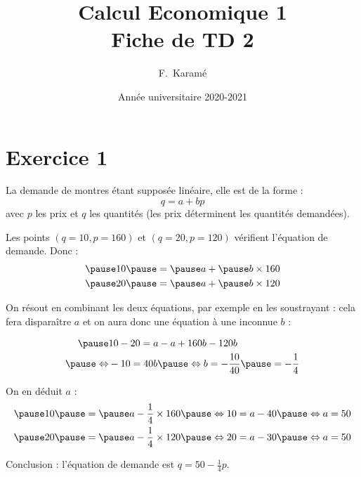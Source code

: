\documentclass[9pt,professionalfonts,handout,hyperref]{beamer}
\title{Calcul Economique 1\\Fiche de TD 2}
\author{F.~Karamé}
\date{Année universitaire 2020-2021}
\begin{document}
\begin{frame}
	\titlepage
\end{frame}

\section{Exercice 1}

%
%

\begin{frame}

La demande de montres étant supposée linéaire, elle est de la forme : $$q = a + bp $$ avec $p$ les prix et $q$ les quantités (les prix déterminent les quantités demandées).\newline

\pause Les points $(q=10,p=160)$ et $(q=20,p=120)$ vérifient l'équation de demande. \pause Donc : 
\[
\begin{aligned}
\pause 10 \pause &= \pause a + \pause b\times 160  \\
\pause 20 \pause &= \pause a + \pause b\times 120 
\end{aligned}
\]

\pause On résout en combinant les deux équations, par exemple en les soustrayant : \pause cela fera disparaître $a$ et on aura donc une équation à une inconnue $b$ : 

\[
\begin{aligned}
\pause &10-20 = a-a + 160b -120b \\
\pause \Leftrightarrow&-10 = 40b \pause \Leftrightarrow b = -\frac{10}{40} \pause = -\frac{1}{4} \\
\end{aligned}
\]

\pause On en déduit $a$ : 
\[
\begin{aligned}
\pause 10 \pause &= \pause a -\frac{1}{4}\times 160\pause \Leftrightarrow 10 = a - 40 \pause \Leftrightarrow  a = 50\\
\pause 20 \pause &= \pause a -\frac{1}{4} \times 120\pause \Leftrightarrow 20 = a - 30 \pause \Leftrightarrow  a = 50
\end{aligned}
\]

\pause Conclusion : l'équation de demande est $q = 50 -\frac{1}{4}p $. 
\end{frame}
\end{document}
